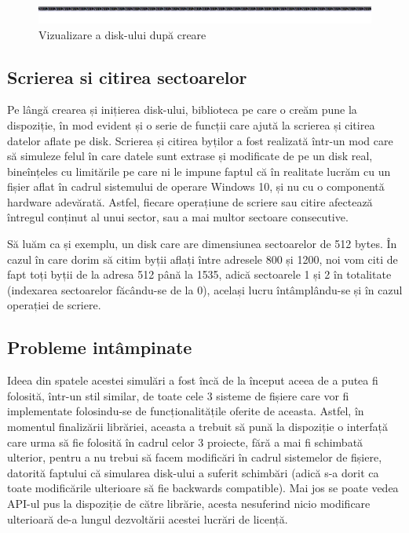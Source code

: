 \begin{figure}[h]
    \centering
    \includegraphics[width=1.0\linewidth]{images/2.2.png}
    \caption{Vizualizare a disk-ului după creare}
    \label{fig:enter-label}
\end{figure}


\subsection{Scrierea si citirea sectoarelor}

Pe lângă crearea și inițierea disk-ului, biblioteca pe care o creăm pune la dispoziție, în mod evident și o serie de funcții care ajută la scrierea și citirea datelor aflate pe disk. Scrierea și citirea byților a fost realizată într-un mod care să simuleze felul în care datele sunt extrase și modificate de pe un disk real, bineînțeles cu limitările pe care ni le impune faptul că în realitate lucrăm cu un fișier aflat în cadrul sistemului de operare Windows 10, și nu cu o componentă hardware adevărată. Astfel, fiecare operațiune de scriere sau citire afectează întregul conținut al unui sector, sau a mai multor sectoare consecutive.

Să luăm ca și exemplu, un disk care are dimensiunea sectoarelor de 512 bytes. În cazul în care dorim să citim byții aflați între adresele 800 și 1200, noi vom citi de fapt toți byții de la adresa 512 până la 1535, adică sectoarele 1 și 2 în totalitate (indexarea sectoarelor făcându-se de la 0), același lucru întâmplându-se și în cazul operației de scriere.

\bigskip

\subsection{Probleme intâmpinate}

Ideea din spatele acestei simulări a fost încă de la început aceea de a putea fi folosită, într-un stil similar, de toate cele 3 sisteme de fișiere care vor fi implementate folosindu-se de funcționalitățile oferite de aceasta. Astfel, în momentul finalizării librăriei, aceasta a trebuit să pună la dispoziție o interfață care urma să fie folosită în cadrul celor 3 proiecte, fără a mai fi schimbată ulterior, pentru a nu trebui să facem modificări în cadrul sistemelor de fișiere, datorită faptului că simularea disk-ului a suferit schimbări (adică s-a dorit ca toate modificările ulterioare să fie backwards compatible). Mai jos se poate vedea API-ul pus la dispoziție de către  librărie, acesta nesuferind nicio modificare ulterioară de-a lungul dezvoltării acestei lucrări de licență.

